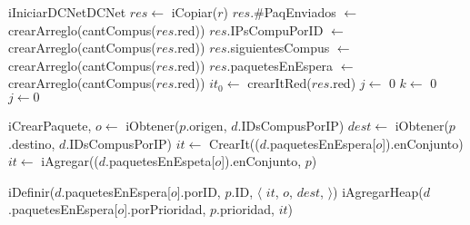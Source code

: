 \begin{Algoritmos}

  \begin{algoritmo}{iIniciarDCNet}{}{DCNet}
    $res \gets$ iCopiar($r$)\;
    $res$.\#PaqEnviados $\gets$ crearArreglo(cantCompus($res$.red))\;
    $res$.IPsCompuPorID $\gets$ crearArreglo(cantCompus($res$.red))\;
    $res$.siguientesCompus $\gets$ crearArreglo(cantCompus($res$.red))\;
    $res$.paquetesEnEspera $\gets$ crearArreglo(cantCompus($res$.red))\;
     $it_{0} \gets$ crearItRed($res$.red)\;
     $j \gets$ 0\;
     $k \gets$ 0\;
    $j \gets 0$\;
  \end{algoritmo}


  \begin{algoritmo}{iCrearPaquete}{,}{}
     $o \gets$ iObtener($p$.origen, $d$.IDsCompusPorIP)\;
     $dest \gets$ iObtener($p$.destino, $d$.IDsCompusPorIP)\;
    $it \gets$ CrearIt(($d$.paquetesEnEspera[$o$]).enConjunto)\;
    $it \gets$ iAgregar(($d$.paquetesEnEspeta[$o$]).enConjunto, $p$)\;

    iDefinir($d$.paquetesEnEspera[$o$].porID, $p$.ID, $\langle$ $it$, $o$, $dest$, $\rangle$)\;
    iAgregarHeap($d$.paquetesEnEspera[$o$].porPrioridad, $p$.prioridad, $it$)\; %

    
  \end{algoritmo}


\end{Algoritmos}
